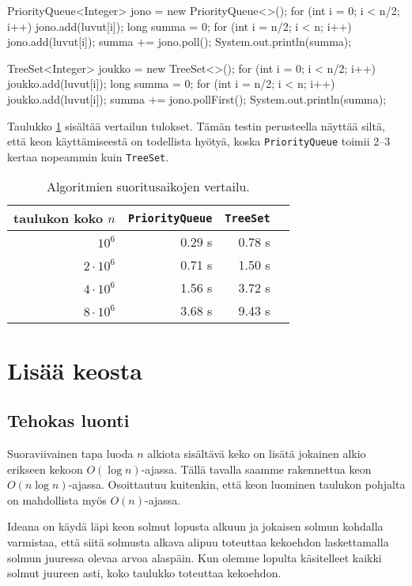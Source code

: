 \begin{code}
PriorityQueue<Integer> jono = new PriorityQueue<>();
for (int i = 0; i < n/2; i++) {
    jono.add(luvut[i]);
}
long summa = 0;
for (int i = n/2; i < n; i++) {
    jono.add(luvut[i]);
    summa += jono.poll();
}
System.out.println(summa);
\end{code}

\begin{code}
TreeSet<Integer> joukko = new TreeSet<>();
for (int i = 0; i < n/2; i++) {
    joukko.add(luvut[i]);
}
long summa = 0;
for (int i = n/2; i < n; i++) {
    joukko.add(luvut[i]);
    summa += jono.pollFirst();
}
System.out.println(summa);
\end{code}

Taulukko \ref{tab:kekver} sisältää vertailun tulokset.
Tämän testin perusteella näyttää siltä,
että keon käyttämiseestä on todellista hyötyä,
koska \texttt{PriorityQueue} toimii 2–3
kertaa nopeammin kuin \texttt{TreeSet}.

\begin{table}
\center
\begin{tabular}{rrrr}
taulukon koko $n$ & \texttt{PriorityQueue} & \texttt{TreeSet} \\
\hline
$10^6$ & 0.29 s & 0.78 s \\
$2 \cdot 10^6$ & 0.71 s & 1.50 s \\
$4 \cdot 10^6$ & 1.56 s & 3.72 s \\
$8 \cdot 10^6$ & 3.68 s & 9.43 s \\
\end{tabular}
\caption{Algoritmien suoritusaikojen vertailu.}
\label{tab:kekver}
\end{table}

\section{Lisää keosta}

\subsection{Tehokas luonti}

Suoraviivainen tapa luoda $n$ alkiota sisältävä keko
on lisätä jokainen alkio erikseen kekoon $O(\log n)$-ajassa.
Tällä tavalla saamme rakennettua keon $O(n \log n)$-ajassa.
Osoittautuu kuitenkin, että keon luominen taulukon pohjalta
on mahdollista myös $O(n)$-ajassa.

Ideana on käydä läpi keon solmut lopusta alkuun ja
jokaisen solmun kohdalla varmistaa,
että siitä solmusta alkava alipuu toteuttaa kekoehdon
laskettamalla solmun juuressa olevaa arvoa alaspäin.
Kun olemme lopulta käsitelleet kaikki solmut juureen asti,
koko taulukko toteuttaa kekoehdon.


